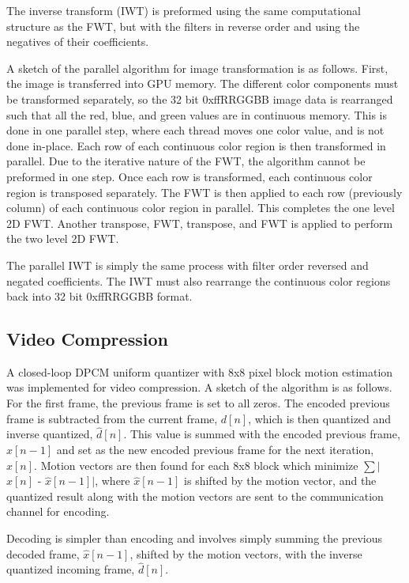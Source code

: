 \documentclass[10pt,twocolumn,twoside]{IEEEtran}
\begin{document}
The inverse transform (IWT) is preformed using the same computational structure as the FWT, but with the filters in reverse order and using the negatives of their coefficients.

A sketch of the parallel algorithm for image transformation is as follows. First, the image is transferred into GPU memory. The different color components must be transformed separately, so the 32 bit 0xffRRGGBB image data is rearranged such that all the red, blue, and green values are in continuous memory. This is done in one parallel step, where each thread moves one color value, and is not done in-place. Each row of each continuous color region is then transformed in parallel. Due to the iterative nature of the FWT, the algorithm cannot be preformed in one step. Once each row is transformed, each continuous color region is transposed separately. The FWT is then applied to each row (previously column) of each continuous color region in parallel. This completes the one level 2D FWT. Another transpose, FWT, transpose, and FWT is applied to perform the two level 2D FWT.

The parallel IWT is simply the same process with filter order reversed and negated coefficients. The IWT must also rearrange the continuous color regions back into 32 bit 0xffRRGGBB format.

\subsection{Video Compression}

A closed-loop DPCM uniform quantizer with 8x8 pixel block motion estimation was implemented for video compression. A sketch of the algorithm is as follows. For the first frame, the previous frame is set to all zeros. The encoded previous frame is subtracted from the current frame, $d[n]$, which is then quantized and inverse quantized, $\hat{d}[n]$. This value is summed with the encoded previous frame, $\hat{x}[n-1]$ and set as the new encoded previous frame for the next iteration, $\hat{x}[n]$. Motion vectors are then found for each 8x8 block which minimize $\sum$$\mid$$x[n]$ - $\hat{x}[n-1]$$\mid$, where $\hat{x}[n-1]$ is shifted by the motion vector, and the quantized result along with the motion vectors are sent to the communication channel for encoding.

Decoding is simpler than encoding and involves simply summing the previous decoded frame, $\hat{x}[n-1]$, shifted by the motion vectors, with the inverse quantized incoming frame, $\hat{d}[n]$.
\end{document}
